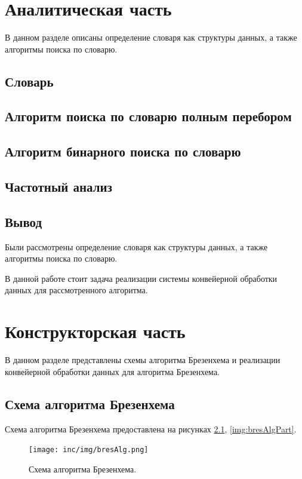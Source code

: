 \documentclass[12pt]{report}
\begin{document}
\chapter{Аналитическая часть}
В данном разделе описаны определение словаря как структуры данных, а также алгоритмы поиска по словарю.

\section{Словарь}

\section{Алгоритм поиска по словарю полным перебором}

\section{Алгоритм бинарного поиска по словарю}

\section{Частотный анализ}

\section*{Вывод}
Были рассмотрены определение словаря как структуры данных, а также алгоритмы поиска по словарю.

В данной работе стоит задача реализации системы конвейерной обработки данных для рассмотренного алгоритма.

\chapter{Конструкторская часть}
В данном разделе представлены схемы алгоритма Брезенхема и реализации конвейерной обработки данных для алгоритма Брезенхема.
\section{Схема алгоритма Брезенхема}
Схема алгоритма Брезенхема предоставлена на рисунках \ref{img:bresAlg}, \ref{img:bresAlgPart}.

\begin{figure}
\begin{center}
\texttt{[image: inc/img/bresAlg.png]}
\captionsetup{justification=centering}
	\caption{Схема алгоритма Брезенхема.}
	\label{img:bresAlg}	
\end{center}
\end{figure}
\end{document}

